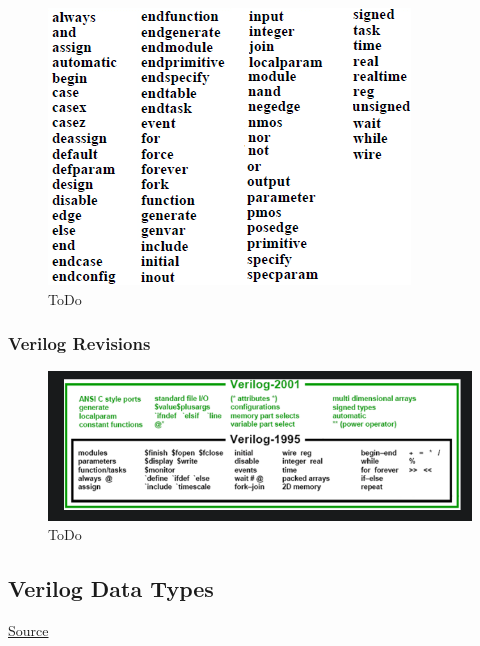 \documentclass{article}
\begin{document}
	\begin{figure}[H]
		\includegraphics[width=\linewidth]{VerilogPics/figure_10.png}
		\caption{ToDo}
		\label{ToDo}
	\end{figure}

	\subsubsection{Verilog Revisions}
	\begin{figure}[H]
		\includegraphics[width=\linewidth]{VerilogPics/figure_11.png}
		\caption{ToDo}
		\label{ToDo}
	\end{figure}




	\subsection{Verilog Data Types}

	\href{https://www.chipverify.com/verilog/verilog-data-types}{Source} \newline \newline
\end{document}

